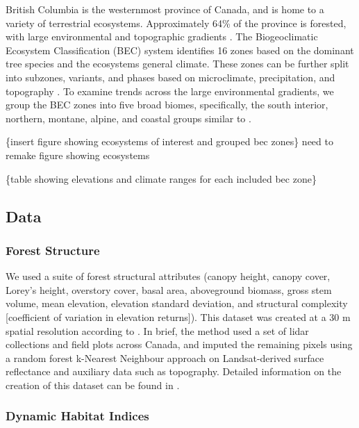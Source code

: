 \documentclass[
  authoryear,
  review,
  3p,
  twocolumn]{elsarticle}
\begin{document}
British Columbia is the westernmost province of Canada, and is home to a
variety of terrestrial ecosystems. Approximately 64\% of the province is
forested, with large environmental and topographic gradients
\citep{pojar1987, bcministryofforests2003}. The Biogeoclimatic Ecosystem
Classification (BEC) system identifies 16 zones based on the dominant
tree species and the ecosystems general climate. These zones can be
further split into subzones, variants, and phases based on microclimate,
precipitation, and topography \citep{pojar1987}. To examine trends
across the large environmental gradients, we group the BEC zones into
five broad biomes, specifically, the south interior, northern, montane,
alpine, and coastal groups similar to \citet{hamann2006}.

\{insert figure showing ecosystems of interest and grouped bec zones\}
need to remake figure showing ecosystems

\{table showing elevations and climate ranges for each included bec
zone\}

\hypertarget{data}{%
\subsection{Data}\label{data}}

\hypertarget{forest-structure}{%
\subsubsection{Forest Structure}\label{forest-structure}}

We used a suite of forest structural attributes (canopy height, canopy
cover, Lorey's height, overstory cover, basal area, aboveground biomass,
gross stem volume, mean elevation, elevation standard deviation, and
structural complexity {[}coefficient of variation in elevation
returns{]}). This dataset was created at a 30 m spatial resolution
according to \citet{matasci2018}. In brief, the method used a set of
lidar collections and field plots across Canada, and imputed the
remaining pixels using a random forest k-Nearest Neighbour approach on
Landsat-derived surface reflectance and auxiliary data such as
topography. Detailed information on the creation of this dataset can be
found in \citet{matasci2018}.

\hypertarget{dynamic-habitat-indices}{%
\subsubsection{Dynamic Habitat Indices}\label{dynamic-habitat-indices}}
\end{document}
